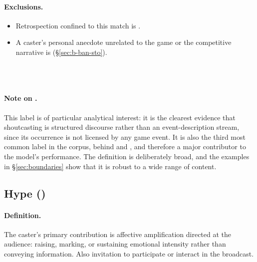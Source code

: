 \paragraph{Exclusions.}
\begin{itemize}
  \item Retrospection confined to this match is \REC{}.
  \item A caster's personal anecdote unrelated to the game or the competitive narrative is \BAN{} (\S\ref{sec:b-ban-sto}).
\end{itemize}

\begin{agexample}
\\[2pt]
\\[2pt]
\end{agexample}

\paragraph{Note on \cSTO{}.} This label is of particular analytical interest: it is the clearest evidence that shoutcasting is structured discourse rather than an event-description stream, since its occurrence is not licensed by any game event. It is also the third most common label in the corpus, behind \PBP{} and \SA{}, and therefore a major contributor to the model's performance. The definition is deliberately broad, and the examples in \S\ref{sec:boundaries} show that it is robust to a wide range of content.

\subsection{Hype (\cHYP{})}
\label{sec:def-hyp}

\paragraph{Definition.} The caster's primary contribution is affective amplification directed at the audience: raising, marking, or sustaining emotional intensity rather than conveying information. Also invitation to participate or interact in the broadcast. 

